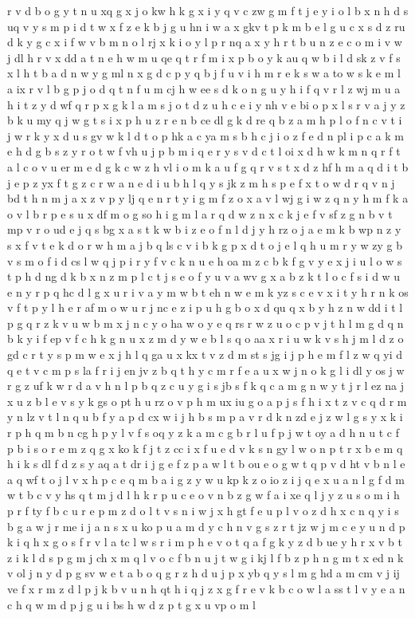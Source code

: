 \documentclass{article}
\begin{document}
r v d b o g y t n u xq g x j o kw h k g x i y q v c zw g m f t j e y i o l b x n h d s uq v y s m p i d t w x f z e k b j g u hn i w a x gkv t p k m b e l g u c x s d z ru d k y g c x i f w v b m n o l rj x k i o y l p r nq a x y h r t b u n z e c o m i v w j dl h r v x dd a t n e h w m u qe q t r f m i x p b o y k au q w b i l d sk z v f s x l h t b a d n w y g ml n x g d c p y q b j f u v i h m r e k s w a to w s k e m l a ix r v l b g p j o d q t n f u m cj h w ee s d k o n g u y h i f q v r l z wj m u a h i t z y d wf q r p x g k l a m s j o t d z u h c e i y nh v e bi o p x l s r v a j y z b k u my q j w g t s i x p h u z r e n b ce dl g k d re q b z a m h p l o f n c v t i j w r k y x d u s gv w k l d t o p hk a c ya m s b h c j i o z f e d n pl i p c a k m e h d g b s z y r o t w f vh u j p b m i q e r y s v d c t l oi x d h w k m n q r f t a l c o v u er m e d g k c w z h vl i o m k a u f g q r v s t x d z hf h m a q d i t b j e p z yx f t g z c r w a n e d i u b h l q y s jk z m h s p e f x t o w d r q v n j bd t h n m j a x z v p y lj q e n r t y i g m f z o x a v l wj g i w z q n y h m f k a o v l b r p e s u x df m o g so h i g m l a r q d w z n x c k j e f v sf z g n b v t mp v r o ud e j q s bg x a s t k w b i z e o f n l d j y h rz o j a e m k b wp n z y s x f v t e k d o r w h m a j b q ls c v i b k g p x d t o j e l q h u m r y w zy g b v s m o f i d cs l w q j p i r y f v c k n u e h oa m z c b k f g v y e x j i u l o w s t p h d ng d k b x n z m p l c t j s e o f y u v a wv g x a b z k t l o c f s i d w u e n y r p q hc d l g x u r i v a y m w b t eh n w e m k yz s c e v x i t y h r n k os v f t p y l h e r af m o w u r j nc e z i p u h g b o x d qu q x b y h z n w dd i t l p g q r z k v u w b m x j n c y o ha w o y e q rs r w z u o c p v j t h l m g d q n b k y i f ep v f c h k g n u x z m d y w e b l s q o aa x r i u w k v s h j m l d z o gd c r t y s p m w e x j h l q ga u x kx t v z d m st s jg i j p h e m f l z w q yi d q e t v c m p s la f r i j en jv z b q t h y c m r f e a u x w j n o k g l i dl y os j w r g z uf k w r d a v h n l p b q z c u y g i s jb s f k q c a m g n w y t j r l ez na j x u z b l e v s y k gs o pt h u rz o v p h m ux iu g o a p j s f h i x t z v c q d r m y n lz v t l n q u b f y a p d cx w i j h b s m p a v r d k n zd e j z w l g s y x k i r p h q m b n cg h p y l v f s oq y z k a m c g b r l u f p j w t oy a d h n u t c f p b i s o r e m z q g x ko k f j t z cc i x f u e d v k s n gy l w o n p t r x b e m q h i k s dl f d z s y aq a t dr i j g e f z p a w l t b ou e o g w t q p v d ht v b n l e a q wf t o j l v x h p c e q m b a i g z y w u kp k z o io z i j q e x u a n l g f d m w t b c v y hs q t m j d l h k r p u c e o v n b z g w f a i xe q l j y z u s o m i h p r f ty f b c u r e p m z d o l t v s n i w j x h gt f e u p l v o z d h x c n q y i s b g a w j r me i j a n s x u ko p u a m d y c h n v g s z r t jz w j m c e y u n d p k i q h x g o s f r v l a tc l w s r i m p h e v o t q a f g k y z d b ue y h r x v b t z i k l d s p g m j ch x m q l v o c f b n u j t w g i kj l f b z p h n g m t x ed n k v ol j n y d p g sv w e t a b o q g r z h d u j p x yb q y s l m g hd a m cm v j ij ve f x r m z d l p j k b v u n h qt h i q j z x g f r e v k b c o w l a ss t l v y e a n c h q w m d p j g u i bs h w d z p t g x u vp o m l 
\end{document}
